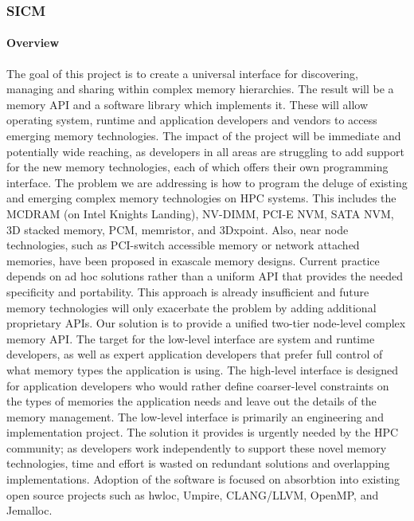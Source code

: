 \subsubsection{ SICM}
\paragraph{Overview} The goal of this project is to create a universal interface for discovering, managing and sharing within complex memory hierarchies. The result will be a memory API and a software library which implements it. These will allow operating system, runtime and application developers and vendors to access emerging memory technologies. The impact of the project will be immediate and potentially wide reaching, as developers in all areas are struggling to add support for the new memory technologies, each of which offers their own programming interface. The problem we are addressing is how to program the deluge of existing and emerging complex memory technologies on HPC systems. This includes the MCDRAM (on Intel Knights Landing), NV-DIMM, PCI-E NVM, SATA NVM, 3D stacked memory, PCM, memristor, and 3Dxpoint. Also, near node technologies, such as PCI-switch accessible memory or network attached memories, have been proposed in exascale memory designs. Current practice depends on ad hoc solutions rather than a uniform API that provides the needed specificity and portability. This approach is already insufficient and future memory technologies will only exacerbate the problem by adding additional proprietary APIs. Our solution is to provide a unified two-tier node-level complex memory API. The target for the low-level interface are system and runtime developers, as well as expert application developers that prefer full control of what memory types the application is using. The high-level interface is designed for application developers who would rather define coarser-level constraints on the types of memories the application needs and leave out the details of the memory management. The low-level interface is primarily an engineering and implementation project. The solution it provides is urgently needed by the HPC community; as developers work independently to support these novel memory technologies, time and effort is wasted on redundant solutions and overlapping implementations. Adoption of the software is focused on absorbtion into existing open source projects such as hwloc, Umpire, CLANG/LLVM, OpenMP, and Jemalloc.
